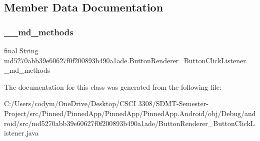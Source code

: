 \subsection{Member Data Documentation}
\mbox{\label{classmd5270abb39e60627f0f200893b490a1ade_1_1_button_renderer___button_click_listener_acbb70b7781fb2d4c00834405eb00337a}} 
\subsubsection{\texorpdfstring{\+\_\+\+\_\+md\+\_\+methods}{\_\_md\_methods}}
{\footnotesize\ttfamily final String md5270abb39e60627f0f200893b490a1ade.\+Button\+Renderer\+\_\+\+Button\+Click\+Listener.\+\_\+\+\_\+md\+\_\+methods\hspace{0.3cm}{\ttfamily [static]}}



The documentation for this class was generated from the following file\+:\begin{DoxyCompactItemize}
\item 
C\+:/\+Users/codym/\+One\+Drive/\+Desktop/\+C\+S\+C\+I 3308/\+S\+D\+M\+T-\/\+Semester-\/\+Project/src/\+Pinned/\+Pinned\+App/\+Pinned\+App/\+Pinned\+App.\+Android/obj/\+Debug/android/src/md5270abb39e60627f0f200893b490a1ade/Button\+Renderer\+\_\+\+Button\+Click\+Listener.\+java\end{DoxyCompactItemize}
